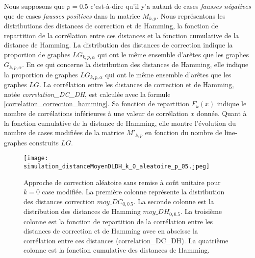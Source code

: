 

Nous supposons que $p=0.5$ c'est-\`a-dire qu'il y'a autant de cases {\em fausses n\'egatives} que de cases {\em fausses positives} dans la matrice $M_{k,p}$.
\newline
Nous repr\'esentons les distributions des distances de correction et de Hamming, la fonction de repartition de la corr\'elation entre ces distances  et la fonction cumulative de la distance de Hamming. 
La distribution des distances de correction indique la proportion de graphes $LG_{k,p,\alpha}$ qui ont le m\^eme ensemble d'ar\^etes que les graphes $G_{k,p,\alpha}$. En ce qui concerne la distribution des distances de Hamming, elle indique  la proportion de graphes $LG_{k,p,\alpha}$ qui ont le m\^eme ensemble d'ar\^etes que les graphes $LG$.
La corr\'elation entre les distances de correction et de Hamming, not\'ee {\em correlation\_DC\_DH}, est calcul\'ee avec la formule \ref{correlation_correction_hamming}. Sa fonction de repartition $F_k(x)$ indique le nombre de corr\'elations inf\'erieures \`a une valeur de corr\'elation $x$ donn\'ee.
Quant \`a la fonction cumulative de la distance de Hamming, elle montre l'\'evolution du nombre de cases modifi\'ees de la matrice $M'_{k,p}$ en fonction du nombre de line-graphes  construits $LG$.
\newline
\begin{figure}[htb!] 
\centering
\texttt{[image: simulation\_distanceMoyenDLDH\_k\_0\_aleatoire\_p\_05.jpeg]}
\caption{ Approche de correction al\'eatoire sans remise \`a co\^ut unitaire pour $k =0 $ case modifi\'ee. La premi\`ere colonne repr\'esente la distribution des distances correction $moy\_DC_{0,0.5}$. La seconde colonne est la distribution des distances de Hamming $moy\_DH_{0,0.5}$. La troisi\`eme colonne  est la fonction de repartition de la corr\'elation entre les distances de correction et de Hamming avec en abscisse la corr\'elation entre ces distances (correlation\_DC\_DH).  La quatri\`eme colonne est la fonction cumulative des distances de Hamming.}
\label{sansremise_unitaire_distanceMoyenDCDH_k_0_aleatoire_p_05} 
\end{figure}
\FloatBarrier

